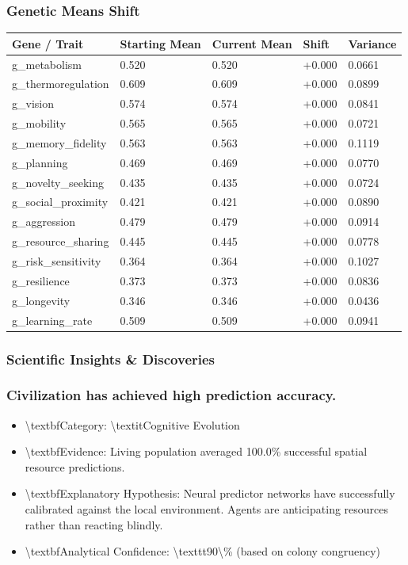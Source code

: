 \documentclass[11pt,a4paper]{article}
\begin{document}
\subsubsection*{ Genetic Means Shift}
\begin{longtable}{lllll}
\toprule
Gene / Trait & Starting Mean & Current Mean & Shift & Variance \\
\midrule
\endhead
g\_metabolism & 0.520 & 0.520 & +0.000 & 0.0661 \\
g\_thermoregulation & 0.609 & 0.609 & +0.000 & 0.0899 \\
g\_vision & 0.574 & 0.574 & +0.000 & 0.0841 \\
g\_mobility & 0.565 & 0.565 & +0.000 & 0.0721 \\
g\_memory\_fidelity & 0.563 & 0.563 & +0.000 & 0.1119 \\
g\_planning & 0.469 & 0.469 & +0.000 & 0.0770 \\
g\_novelty\_seeking & 0.435 & 0.435 & +0.000 & 0.0724 \\
g\_social\_proximity & 0.421 & 0.421 & +0.000 & 0.0890 \\
g\_aggression & 0.479 & 0.479 & +0.000 & 0.0914 \\
g\_resource\_sharing & 0.445 & 0.445 & +0.000 & 0.0778 \\
g\_risk\_sensitivity & 0.364 & 0.364 & +0.000 & 0.1027 \\
g\_resilience & 0.373 & 0.373 & +0.000 & 0.0836 \\
g\_longevity & 0.346 & 0.346 & +0.000 & 0.0436 \\
g\_learning\_rate & 0.509 & 0.509 & +0.000 & 0.0941 \\
\bottomrule
\end{longtable}

\subsubsection*{ Scientific Insights \& Discoveries}
\subsubsection*{ Civilization has achieved high prediction accuracy.}
\begin{itemize}
  \item \textbackslash{}textbf{Category:} \textbackslash{}textit{Cognitive Evolution}
  \item \textbackslash{}textbf{Evidence:} Living population averaged 100.0\% successful spatial resource predictions.
  \item \textbackslash{}textbf{Explanatory Hypothesis:} Neural predictor networks have successfully calibrated against the local environment. Agents are anticipating resources rather than reacting blindly.
  \item \textbackslash{}textbf{Analytical Confidence:} \textbackslash{}texttt{90\textbackslash{}\%} (based on colony congruency)
\end{itemize}
\end{document}
